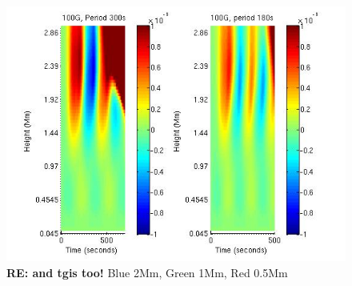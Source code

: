 \documentclass{aastex62}
\begin{document}
\begin{figure}[h]\label{dt_vvert_100G_300s_180s}
\includegraphics[scale=0.65]{imrescale/dt_vvert_100G_300s_180s.jpg}
\caption{{\bf RE: and tgis too!} Blue 2Mm, Green 1Mm, Red 0.5Mm}
\end{figure}







\end{document}
